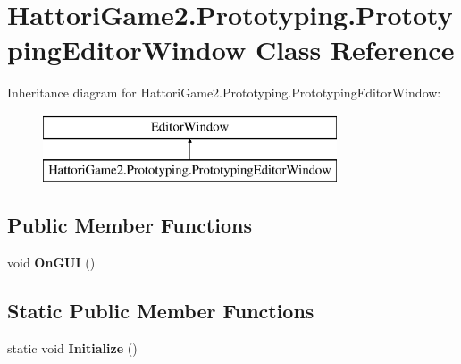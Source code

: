 \hypertarget{class_hattori_game2_1_1_prototyping_1_1_prototyping_editor_window}{}\section{Hattori\+Game2.\+Prototyping.\+Prototyping\+Editor\+Window Class Reference}
\label{class_hattori_game2_1_1_prototyping_1_1_prototyping_editor_window}
Inheritance diagram for Hattori\+Game2.\+Prototyping.\+Prototyping\+Editor\+Window\+:\begin{figure}[H]
\begin{center}
\leavevmode
\includegraphics[height=2.000000cm]{class_hattori_game2_1_1_prototyping_1_1_prototyping_editor_window}
\end{center}
\end{figure}
\subsection*{Public Member Functions}
\begin{DoxyCompactItemize}
\item 
\hypertarget{class_hattori_game2_1_1_prototyping_1_1_prototyping_editor_window_a256ce087320f9aadf02f0060edcf454b}{}void {\bfseries On\+G\+U\+I} ()\label{class_hattori_game2_1_1_prototyping_1_1_prototyping_editor_window_a256ce087320f9aadf02f0060edcf454b}

\end{DoxyCompactItemize}
\subsection*{Static Public Member Functions}
\begin{DoxyCompactItemize}
\item 
\hypertarget{class_hattori_game2_1_1_prototyping_1_1_prototyping_editor_window_ac890ecbd8d3228483087081320fca63e}{}static void {\bfseries Initialize} ()\label{class_hattori_game2_1_1_prototyping_1_1_prototyping_editor_window_ac890ecbd8d3228483087081320fca63e}

\end{DoxyCompactItemize}
